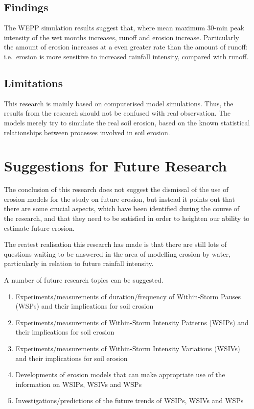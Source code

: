 \subsection{Findings}
\label{sec:FindingsStage4}

The WEPP simulation results suggest that, where mean maximum 30-min peak
intensity of the wet months increases, runoff and erosion increase. Particularly
the amount of erosion increases at a even greater rate than the amount of
runoff: i.e.\ erosion is more sensitive to increased rainfall intensity, compared
with runoff.


\subsection{Limitations}
\label{sec:LimitationsStage4}
This research is mainly based on computerised model simulations. Thus, the
results from the research should not be confused with real observation. The
models merely try to simulate the real soil erosion, based on the known
statistical relationships between processes involved in soil erosion.

\section{Suggestions for Future Research}
\label{sec:SuggestionsForFutureResearch}

The conclusion of this research does not suggest the dismissal of the use of
erosion models for the study on future erosion, but instead it points out that
there are some crucial aspects, which have been identified during the course of
the research, and that they need to be satisfied in order to heighten our
ability to estimate future erosion.

The reatest realisation this research has made is that there are still lots of
questions waiting to be answered in the area of modelling erosion by water,
particularly in relation to future rainfall intensity.

A number of future research topics can be suggested.
\begin{enumerate}
  \item Experiments/measurements of duration/frequency of Within-Storm Pauses
(WSPs) and their implications for soil erosion
  \item Experiments/measurements of Within-Storm Intensity Patterns (WSIPs) and
their implications for soil erosion
  \item Experiments/measurements of Within-Storm Intensity Variations (WSIVs)
and their implications for soil erosion
  \item Developments of erosion models that can make appropriate use of the
information on WSIPs, WSIVs and WSPs
  \item Investigations/predictions of the future trends of WSIPs, WSIVs and WSPs
\end{enumerate}

